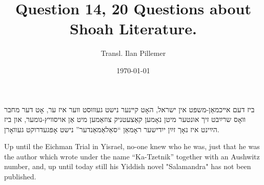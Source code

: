 \documentclass{article}
\begin{document}
\renewcommand{\abstractname}{\vspace{-\baselineskip}}
\title{Question 14, 20 Questions about Shoah Literature.}
\author{Transl. Ilan Pillemer}
\date{\today}

\maketitle
{}
\newline

\begin{pairs}

\begin{Rightside}

\begin{RTL}
\begin{hebrew}
\beginnumbering
\autopar
{}

ביז דעם אײכמאַן-משפּט אין ישראל, האָט קײנער נישט געװוּסט װער איז ער, אָט דער מחבר װאָס שרײַבט זיך אונטער מיטן נאָמען קאַצעטניק צוזאַמען מיט אַן אויסװיץ-נומער,
 און ביז הײַינט איז נאָך זײַן ייִדישער ראָמאַן ``סאַלאַמאַנדער'' נישט אָפּגעדרוקט געװאָרן.
 

\endnumbering
\end{hebrew}
\end{RTL}
\end{Rightside}


\begin{Leftside}
\begin{english}
\beginnumbering
\autopar
{}
 
 Up until the Eichman Trial in Yisrael, no-one knew who he was, just that he was the author which wrote under the name 
 ``Ka-Tzetnik'' together with an Aushwitz number, and, up until today still his Yiddish novel "Salamandra" has not been published.
 
 
\endnumbering
\end{english}
\end{Leftside}

\end{pairs}
\Columns

\end{document}
